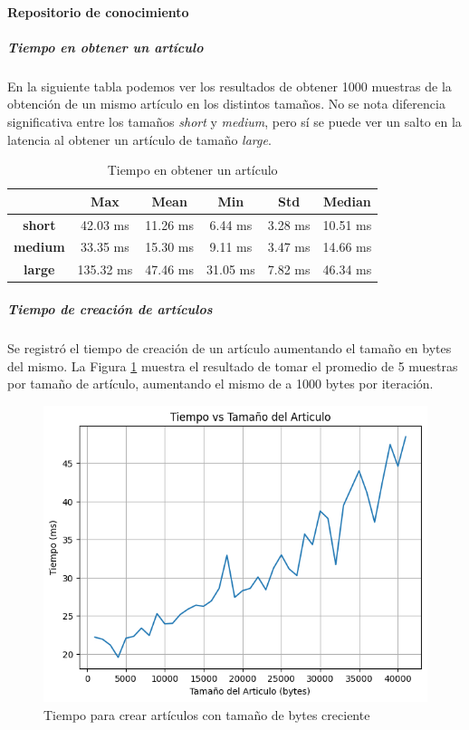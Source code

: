 \paragraph{Repositorio de conocimiento}

\subparagraph{Tiempo en obtener un artículo}

En la siguiente tabla podemos ver los resultados de obtener 1000 muestras de la obtención de un mismo artículo en los distintos tamaños. No se nota diferencia significativa entre los tamaños \textit{short} y \textit{medium}, pero sí se puede ver un salto en la latencia al obtener un artículo de tamaño \textit{large}.

\setlength\tabcolsep{10pt}
\begin{table}[!htbp]
    \centering
    \begin{tabular}{|c|c|c|c|c|c|}
    \hline
    & \textbf{Max} & \textbf{Mean} & \textbf{Min} & \textbf{Std} & \textbf{Median} \\
    \hline
    \textbf{short} & 42.03 ms & 11.26 ms & 6.44 ms & 3.28 ms & 10.51 ms \\
    \hline
    \textbf{medium} & 33.35 ms & 15.30 ms & 9.11 ms & 3.47 ms & 14.66 ms \\
    \hline
    \textbf{large} & 135.32 ms & 47.46 ms & 31.05 ms & 7.82 ms & 46.34 ms \\
    \hline
    \end{tabular}
    \caption{Tiempo en obtener un artículo}
\end{table}

\subparagraph{Tiempo de creación de artículos}

Se registró el tiempo de creación de un artículo aumentando el tamaño en bytes del mismo. La Figura \ref{fig:aw-eth-bytes-articulo-incremental-tiempo} muestra el resultado de tomar el promedio de 5 muestras por tamaño de artículo, aumentando el mismo de a 1000 bytes por iteración.

\begin{figure}[H]
    \centering
    \includegraphics[width=0.75\linewidth]{img/aw-eth-bytes-articulo-incremental-tiempo.png}
    \caption{Tiempo para crear artículos con tamaño de bytes creciente}
    \label{fig:aw-eth-bytes-articulo-incremental-tiempo}
\end{figure}

